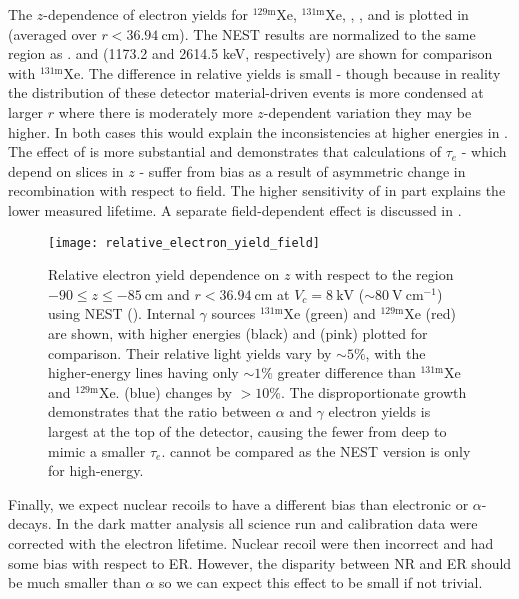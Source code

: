 The $z$-dependence of electron yields for $\mathrm{^{129m}Xe}$, $\mathrm{^{131m}Xe}$, , , and  is
plotted in  (averaged over $r < 36.94\ \mathrm{cm}$).  The NEST results are
normalized to the same region as .   and  (1173.2 and
2614.5 keV, respectively) are shown for comparison with $\mathrm{^{131m}Xe}$.  The difference in relative yields is
small - though because in reality the distribution of these detector material-driven events is more condensed at larger $r$ where there
is moderately more $z$-dependent variation they may be higher.  In both cases this
would explain the inconsistencies at higher energies in .  The
effect of  is more substantial and demonstrates that calculations of $\tau_e$ - which depend on slices in $z$ - suffer from
bias as a result of asymmetric change in recombination with respect to field.  The higher sensitivity of \alphadecays in part explains
the lower measured lifetime.  A separate field-dependent effect is discussed in .

\begin{figure}
\centering
\texttt{[image: relative\_electron\_yield\_field]}
\caption{Relative electron yield dependence on $z$ with respect to the region $-90 \leq z \leq -85\ \mathrm{cm}$ and
$r < 36.94\ \mathrm{cm}$ at $V_c = 8\ \mathrm{kV}$ (${\sim}80\ \mathrm{V\ cm^{-1}}$) using NEST ().  Internal
$\gamma$ sources $\mathrm{^{131m}Xe}$ (green) and
$\mathrm{^{129m}Xe}$
(red) are shown, with higher energies  (black) and  (pink) plotted for comparison. Their relative
light yields vary by ${\sim} 5\%$, with the higher-energy lines having only ${\sim} 1\%$ greater difference than $\mathrm{^{131m}Xe}$ and
$\mathrm{^{129m}Xe}$.   (blue) changes by $> 10\%$.  The disproportionate growth demonstrates that the ratio between
$\alpha$ and $\gamma$ electron yields is largest at the top of the detector, causing the fewer \electron from deep \alphadecays to
mimic a smaller $\tau_e$.  \metakr cannot be compared as the NEST version is only for high-energy.}
\label{fig:electron_lifetimes_rn222_vs_kr83m_field_z}
\end{figure}

Finally, we expect nuclear recoils to have a different bias than electronic or $\alpha$-decays.  In the dark matter analysis all
science run and calibration data were corrected with the \metakr electron lifetime.  Nuclear recoil \cstwob were then incorrect and had
some bias with respect to ER.  However, the disparity between NR and ER should be much smaller than $\alpha$ so we can expect this effect
to be small if not trivial.



